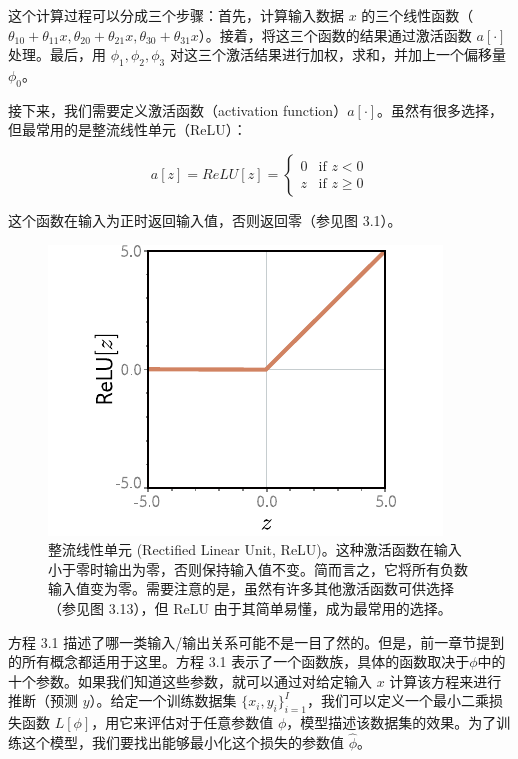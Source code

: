\documentclass[lang=cn,newtx,10pt,scheme=chinese]{elegantbook}
\begin{document}
这个计算过程可以分成三个步骤：首先，计算输入数据 \(x\) 的三个线性函数（\(\theta_{10} + \theta_{11}x, \theta_{20} + \theta_{21}x, \theta_{30} + \theta_{31}x\)）。接着，将这三个函数的结果通过激活函数 \(a[\cdot]\) 处理。最后，用 \(\phi_1, \phi_2, \phi_3\) 对这三个激活结果进行加权，求和，并加上一个偏移量 \(\phi_0\)。

接下来，我们需要定义激活函数（activation function）\(a[\cdot]\)。虽然有很多选择，但最常用的是整流线性单元（ReLU）：

\begin{equation}
a[z] = ReLU[z] = 
\begin{cases}
	0 & \text{if } z < 0 \\
	z & \text{if } z \geq 0
\end{cases} 
\end{equation}

这个函数在输入为正时返回输入值，否则返回零（参见图 3.1）。

\begin{figure}[ht!]
	\centering
	\includegraphics[width=0.7\linewidth]{PDFFigures/UDLChap3PDF/ShallowReLU.pdf}
\caption{整流线性单元 (Rectified Linear Unit, ReLU)。这种激活函数在输入小于零时输出为零，否则保持输入值不变。简而言之，它将所有负数输入值变为零。需要注意的是，虽然有许多其他激活函数可供选择（参见图 3.13），但 ReLU 由于其简单易懂，成为最常用的选择。}
\end{figure}

方程 3.1 描述了哪一类输入/输出关系可能不是一目了然的。但是，前一章节提到的所有概念都适用于这里。方程 3.1 表示了一个函数族，具体的函数取决于\(\phi\)中的十个参数。如果我们知道这些参数，就可以通过对给定输入 \(x\) 计算该方程来进行推断（预测 \(y\)）。给定一个训练数据集 \(\{{x_i,y_i}\}^I_{i=1}\)，我们可以定义一个最小二乘损失函数 \(L[\phi]\)，用它来评估对于任意参数值 \(\phi\)，模型描述该数据集的效果。为了训练这个模型，我们要找出能够最小化这个损失的参数值 \(\hat \phi\)。
\end{document}
